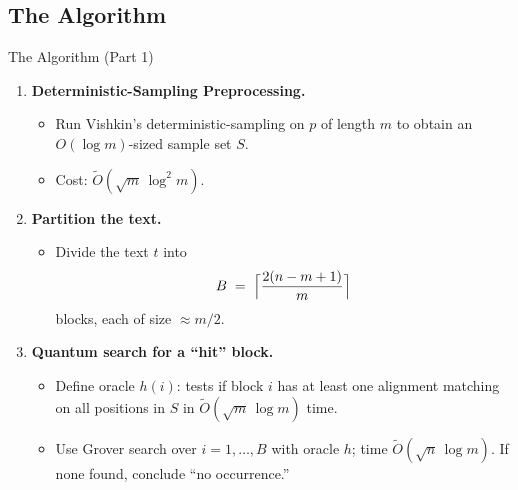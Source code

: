 \documentclass{beamer}
\begin{document}
\subsection{The Algorithm}
\begin{frame}{The Algorithm (Part 1)}
    \begin{enumerate}
        \item \textbf{Deterministic-Sampling Preprocessing.}
              \begin{itemize}
                  \item Run Vishkin's deterministic-sampling on \(p\) of length \(m\) to obtain an \(O(\log m)\)-sized sample set \(S\).
                  \item Cost: \(\widetilde O(\sqrt{m}\,\log^2 m)\).
              \end{itemize}
        \item \textbf{Partition the text.}
              \begin{itemize}
                  \item Divide the text \(t\) into
                        \[
                            B \;=\; \Bigl\lceil \frac{2(n - m + 1)}{m} \Bigr\rceil
                        \]
                        blocks, each of size \(\approx m/2\).
              \end{itemize}
        \item \textbf{Quantum search for a “hit” block.}
              \begin{itemize}
                  \item Define oracle \(h(i)\): tests if block \(i\) has at least one alignment matching on all positions in \(S\) in \(\widetilde O(\sqrt{m}\,\log m)\) time.
                  \item Use Grover search over \(i=1,\dots,B\) with oracle \(h\); time \(\widetilde O(\sqrt{n}\,\log m)\). If none found, conclude “no occurrence.”
              \end{itemize}
    \end{enumerate}
\end{frame}
\end{document}
